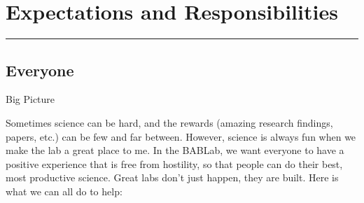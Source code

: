 \documentclass[
]{book}
\begin{document}
\hypertarget{expectations-and-responsibilities}{%
\chapter{Expectations and Responsibilities}\label{expectations-and-responsibilities}}

\begin{center}\rule{0.5\linewidth}{0.5pt}\end{center}

\hypertarget{everyone}{%
\section{Everyone}\label{everyone}}

Big Picture

Sometimes science can be hard, and the rewards (amazing research findings, papers, etc.) can be few and far between. However, science is always fun when we make the lab a great place to me. In the BABLab, we want everyone to have a positive experience that is free from hostility, so that people can do their best, most productive science. Great labs don't just happen, they are built. Here is what we can all do to help:
\end{document}

